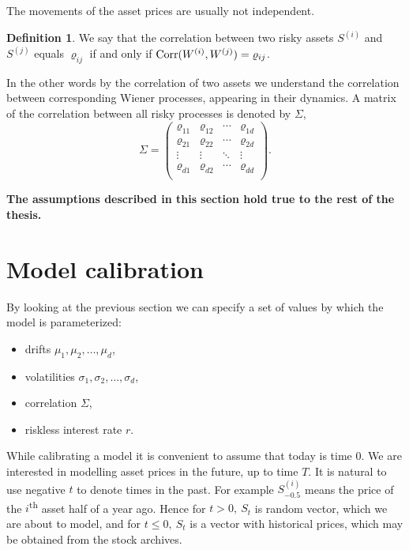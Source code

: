 \documentclass[a4paper,11pt, twoside]{book}
\theoremstyle{definition}
\newtheorem{mydef}{Definition}[chapter]
\theoremstyle{remark}
\newcounter{example}[chapter]
\def\Corr{{\hbox{Corr}}}
\begin{document}
The movements of the asset prices are usually not independent.
\begin{mydef}
 We say that the correlation between two risky assets $S^{(i)}$ and $S^{(j)}$ equals $\varrho_{ij}$ if and only if $\Corr(W^{(i)}, W^{(j)}) = \varrho_{ij}$.
\end{mydef}
In the other words by the correlation of two assets we understand the correlation between corresponding Wiener processes, appearing in their dynamics. A matrix of the correlation between all risky processes is denoted by $\Sigma$,
\begin{equation*}
 \Sigma = \left( \begin{array}{cccc}
           \varrho_{11} & \varrho_{12} & \cdots & \varrho_{1d} \\
           \varrho_{21} & \varrho_{22} & \cdots & \varrho_{2d} \\
           \vdots & \vdots & \ddots & \vdots \\
           \varrho_{d1} & \varrho_{d2} & \cdots & \varrho_{dd} \\
          \end{array} \right).
\end{equation*}

\textbf{The assumptions described in this section hold true to the rest of the thesis.}

\section{Model calibration}
By looking at the previous section we can specify a set of values by which the model is parameterized:
\begin{itemize}
 \item drifts $\mu_1, \mu_2, \ldots, \mu_d$,
 \item volatilities $\sigma_1, \sigma_2, \ldots, \sigma_d$,
 \item correlation $\Sigma$,
 \item riskless interest rate $r$.
\end{itemize}
While calibrating a model it is convenient to assume that today is time $0$. We are interested in modelling asset prices in the future, up to time $T$. It is natural to use negative $t$ to denote times in the past. For example $S^{(i)}_{-0.5}$ means the price of the $i$\textsuperscript{th} asset half of a year ago. Hence for $t > 0,\ S_t$ is random vector, which we are about to model, and for $t \leq 0,\ S_t$ is a vector with historical prices, which may be obtained from the stock archives.
\end{document}
